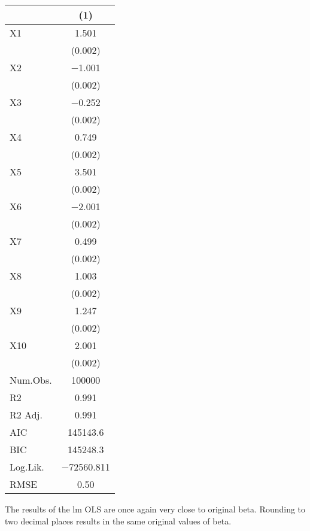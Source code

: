 \documentclass{article}
\begin{document}
\begin{table}[H]
\centering
\begin{tabular}[t]{lc}
\toprule
  & (1)\\
\midrule
X1 & \num{1.501}\\
 & \vphantom{9} (\num{0.002})\\
X2 & \num{-1.001}\\
 & \vphantom{8} (\num{0.002})\\
X3 & \num{-0.252}\\
 & \vphantom{7} (\num{0.002})\\
X4 & \num{0.749}\\
 & \vphantom{6} (\num{0.002})\\
X5 & \num{3.501}\\
 & \vphantom{5} (\num{0.002})\\
X6 & \num{-2.001}\\
 & \vphantom{4} (\num{0.002})\\
X7 & \num{0.499}\\
 & \vphantom{3} (\num{0.002})\\
X8 & \num{1.003}\\
 & \vphantom{2} (\num{0.002})\\
X9 & \num{1.247}\\
 & \vphantom{1} (\num{0.002})\\
X10 & \num{2.001}\\
 & (\num{0.002})\\
\midrule
Num.Obs. & \num{100000}\\
R2 & \num{0.991}\\
R2 Adj. & \num{0.991}\\
AIC & \num{145143.6}\\
BIC & \num{145248.3}\\
Log.Lik. & \num{-72560.811}\\
RMSE & \num{0.50}\\
\bottomrule
\end{tabular}
\end{table}

The results of the lm OLS are once again very close to original beta. Rounding to two decimal places results in the same original values of beta.
\end{document}
